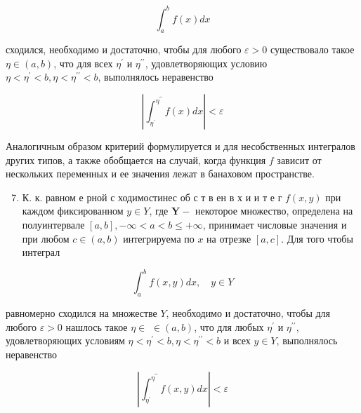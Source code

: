 \documentclass[10pt]{article}
\begin{document}
\[

\int_{a}^{b} f(x) d x

\]



сходился, необходимо и достаточно, чтобы для любого $\varepsilon>0$ существовало такое $\eta \in(a, b)$, что для всех $\eta^{\prime}$ и $\eta^{\prime \prime}$, удовлетворяющих условию $\eta<\eta^{\prime}<b, \eta<\eta^{\prime \prime}<b$, выполнялось неравенство



\[

\left|\int_{\eta^{\prime}}^{\eta^{\prime \prime}} f(x) d x\right|<\varepsilon

\]



Аналогичным образом критерий формулируется и для несобственных интегралов других типов, а также обобщается на случай, когда функция $f$ зависит от нескольких переменных и ее значения лежат в банаховом пространстве.



\begin{enumerate}

  \setcounter{enumi}{6}

  \item К. к. равном е рной с ходимостинес об с т в ен в х и и т е г $f(x, y)$ при каждом фиксированном $y \in Y$, где $\boldsymbol{Y}-$ некоторое множество, определена на полуинтервале $[a, b],-\infty<a<b \leqslant+\infty$, принимает числовые значения и при любом $c \in(a, b)$ интегрируема по $x$ на отрезке $[a, c]$. Для того чтобы интеграл

\end{enumerate}



\[

\int_{a}^{b} f(x, y) d x, \quad y \in Y

\]



равномерно сходился на множестве $Y$, необходимо и достаточно, чтобы для любого $\varepsilon>0$ нашлось такое $\eta \in$ $\in(a, b)$, что для любых $\eta^{\prime}$ и $\eta^{\prime \prime}$, удовлетворяющих условиям $\eta<\eta^{\prime}<b, \eta<\eta^{\prime \prime}<b$ и всех $y \in Y$, выполнялось неравенство



\[

\left|\int_{\eta^{\prime}}^{\eta^{\prime \prime}} f(x, y) d x\right|<\varepsilon

\]
\end{document}
